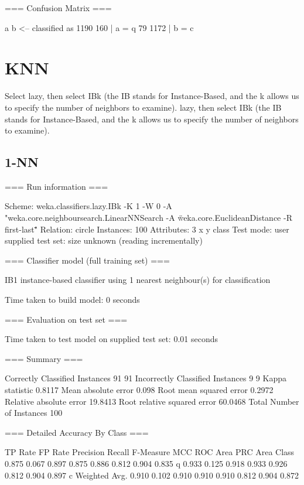 \documentclass{report}
\begin{document}
	=== Confusion Matrix ===
	
	a    b   <-- classified as
	1190  160 |    a = q
	79 1172 |    b = c
	
	
	\section{KNN}
	Select lazy, then select IBk (the IB stands for Instance-Based, and the k allows us to specify the number of neighbors to examine). lazy, then select IBk (the IB stands for Instance-Based, and the k allows us to specify the number of neighbors to examine).
	
	\subsection{1-NN}
	=== Run information ===
	
	Scheme:       weka.classifiers.lazy.IBk -K 1 -W 0 -A "weka.core.neighboursearch.LinearNNSearch -A \"weka.core.EuclideanDistance -R first-last\""
	Relation:     circle
	Instances:    100
	Attributes:   3
	x
	y
	class
	Test mode:    user supplied test set:  size unknown (reading incrementally)
	
	=== Classifier model (full training set) ===
	
	IB1 instance-based classifier
	using 1 nearest neighbour(s) for classification
	
	
	Time taken to build model: 0 seconds
	
	=== Evaluation on test set ===
	
	Time taken to test model on supplied test set: 0.01 seconds
	
	=== Summary ===
	
	Correctly Classified Instances          91               91      %
	Incorrectly Classified Instances         9                9      %
	Kappa statistic                          0.8117
	Mean absolute error                      0.098 
	Root mean squared error                  0.2972
	Relative absolute error                 19.8413 %
	Root relative squared error             60.0468 %
	Total Number of Instances              100     
	
	=== Detailed Accuracy By Class ===
	
	TP Rate  FP Rate  Precision  Recall   F-Measure  MCC      ROC Area  PRC Area  Class
	0.875    0.067    0.897      0.875    0.886      0.812    0.904     0.835     q
	0.933    0.125    0.918      0.933    0.926      0.812    0.904     0.897     c
	Weighted Avg.    0.910    0.102    0.910      0.910    0.910      0.812    0.904     0.872     
	
\end{document}
